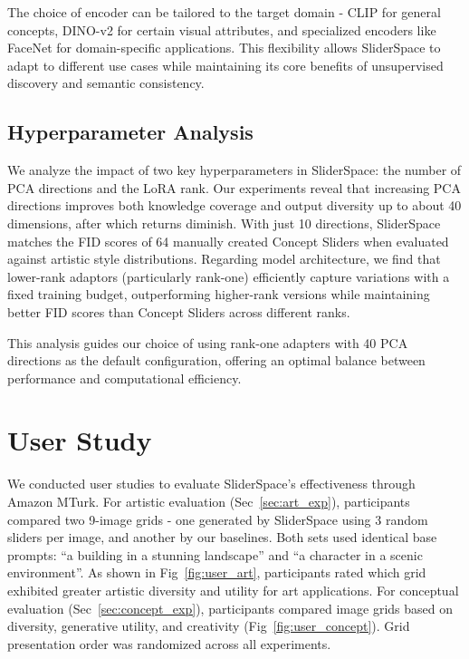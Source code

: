 The choice of encoder can be tailored to the target domain - CLIP for general concepts, DINO-v2 for certain visual attributes, and specialized encoders like FaceNet for domain-specific applications. This flexibility allows SliderSpace to adapt to different use cases while maintaining its core benefits of unsupervised discovery and semantic consistency.



\subsection{Hyperparameter Analysis}
\label{sec:hyperparam}
We analyze the impact of two key hyperparameters in SliderSpace: the number of PCA directions and the LoRA rank. Our experiments reveal that increasing PCA directions improves both knowledge coverage and output diversity up to about 40 dimensions, after which returns diminish. With just 10 directions, SliderSpace matches the FID scores of 64 manually created Concept Sliders when evaluated against artistic style distributions. Regarding model architecture, we find that lower-rank adaptors (particularly rank-one) efficiently capture variations with a fixed training budget, outperforming higher-rank versions while maintaining better FID scores than Concept Sliders across different ranks.

This analysis guides our choice of using rank-one adapters with 40 PCA directions as the default configuration, offering an optimal balance between performance and computational efficiency.




\section{User Study}
We conducted user studies to evaluate SliderSpace's effectiveness through Amazon MTurk. For artistic evaluation (Sec~\ref{sec:art_exp}), participants compared two 9-image grids - one generated by SliderSpace using 3 random sliders per image, and another by our baselines. Both sets used identical base prompts: ``a building in a stunning landscape'' and ``a character in a scenic environment''. As shown in Fig~\ref{fig:user_art}, participants rated which grid exhibited greater artistic diversity and utility for art applications. For conceptual evaluation (Sec~\ref{sec:concept_exp}), participants compared image grids based on diversity, generative utility, and creativity (Fig~\ref{fig:user_concept}). Grid presentation order was randomized across all experiments.

